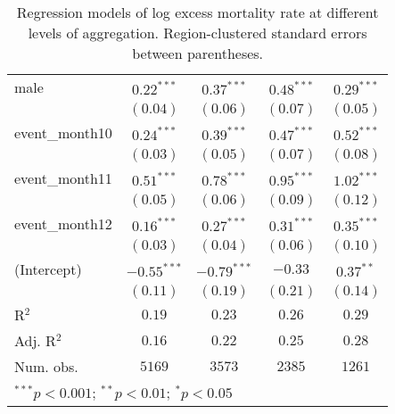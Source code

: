 \begin{table}
\begin{center}
\begin{tabular}{l c c c c}
male           & $0.22^{***}$  & $0.37^{***}$  & $0.48^{***}$  & $0.29^{***}$  \\
               & $(0.04)$      & $(0.06)$      & $(0.07)$      & $(0.05)$      \\
event\_month10 & $0.24^{***}$  & $0.39^{***}$  & $0.47^{***}$  & $0.52^{***}$  \\
               & $(0.03)$      & $(0.05)$      & $(0.07)$      & $(0.08)$      \\
event\_month11 & $0.51^{***}$  & $0.78^{***}$  & $0.95^{***}$  & $1.02^{***}$  \\
               & $(0.05)$      & $(0.06)$      & $(0.09)$      & $(0.12)$      \\
event\_month12 & $0.16^{***}$  & $0.27^{***}$  & $0.31^{***}$  & $0.35^{***}$  \\
               & $(0.03)$      & $(0.04)$      & $(0.06)$      & $(0.10)$      \\
(Intercept)    & $-0.55^{***}$ & $-0.79^{***}$ & $-0.33$       & $0.37^{**}$   \\
               & $(0.11)$      & $(0.19)$      & $(0.21)$      & $(0.14)$      \\
\hline
R$^2$          & $0.19$        & $0.23$        & $0.26$        & $0.29$        \\
Adj. R$^2$     & $0.16$        & $0.22$        & $0.25$        & $0.28$        \\
Num. obs.      & $5169$        & $3573$        & $2385$        & $1261$        \\
\hline
\multicolumn{5}{l}{\scriptsize{$^{***}p<0.001$; $^{**}p<0.01$; $^{*}p<0.05$}}
\end{tabular}
\caption{Regression models of log excess mortality rate at different levels of aggregation. Region-clustered standard errors between parentheses.}
\label{tab:regionmodels}
\end{center}
\end{table}
